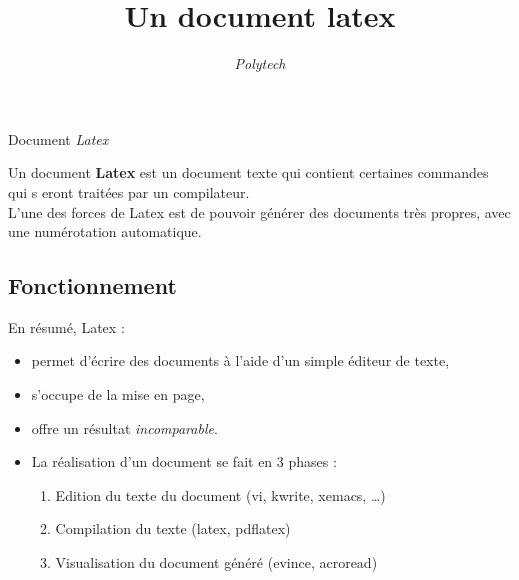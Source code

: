 \title{Un document latex}
\author{\textit{Polytech}}
\date{}




Document \textit{Latex}

Un document \textbf{Latex} est un document texte qui contient certaines
commandes qui s
eront traitées par un compilateur. \\
L'une des forces de Latex est de pouvoir générer des documents très
propres,  avec une numérotation automatique.

\subsection{Fonctionnement}

En résumé, Latex :

\begin{itemize}
\item permet d'écrire des documents à l'aide d'un simple éditeur de texte,
\item s'occupe de la mise en page,
\item offre un résultat \textit{incomparable}. 
\item La réalisation d'un document se fait en 3 phases :
    \begin{enumerate}
    \item Edition du texte du document (vi, kwrite, xemacs, \ldots)
    \item Compilation du texte (latex, pdflatex)
    \item Visualisation du document généré (evince, acroread)
    \end{enumerate}
\end{itemize}



